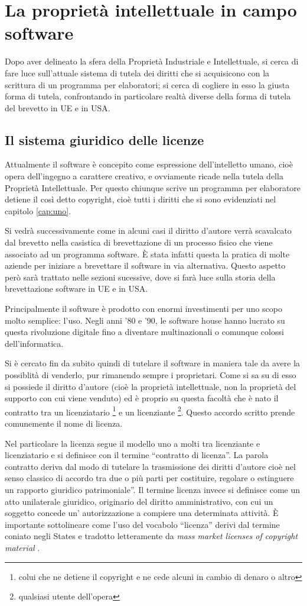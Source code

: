 \chapter{La proprietà intellettuale in campo software}
Dopo aver delineato la sfera della Proprietà Industriale e Intellettuale, si cerca di fare luce sull'attuale sistema di tutela dei diritti che si acquisicono con la scrittura di un programma per elaboratori; si cerca di cogliere in esso la giusta forma di tutela,  confrontando in particolare realtà diverse della forma di tutela del brevetto in UE e in USA.

\section{Il sistema giuridico delle licenze}
Attualmente il software è concepito come espressione dell'intelletto umano, cioè opera dell'ingegno a carattere creativo, e ovviamente ricade nella tutela della Proprietà Intellettuale. Per questo chiunque scrive un programma per elaboratore detiene il così detto copyright, cioè tutti i diritti che si sono evidenziati nel capitolo \ref{cap:uno}.

Si vedrà successivamente come in alcuni casi il diritto d'autore verrà scavalcato dal brevetto nella casistica di brevettazione di un processo fisico che viene associato ad un programma software. \`E stata infatti questa la pratica di molte aziende per iniziare a brevettare il software in via alternativa. Questo aspetto però sarà trattato nelle sezioni sucessive, dove si farà luce sulla storia della brevettazione software in UE e in USA.

Principalmente il software è prodotto con enormi investimenti per uno scopo molto semplice: l'uso. Negli anni '80 e '90, le software house hanno lucrato su questa rivoluzione digitale fino a diventare multinazionali o comunque colossi dell'informatica.

Si è cercato fin da subito quindi di tutelare il software in maniera tale da avere la possiblità di venderlo, pur rimanendo sempre i proprietari. Come si sa su di esso si possiede il diritto d'autore (cioè la proprietà intellettuale, non la proprietà del supporto con cui viene venduto) ed è proprio su questa facoltà che è nato il contratto tra un licenziatario \footnote{colui che ne detiene il copyright e ne cede alcuni in cambio di denaro o altro} e un licenziante \footnote{qualsiasi utente dell'opera}. Questo accordo scritto prende comunemente il nome di licenza.

Nel particolare la licenza segue il modello uno a molti tra licenziante e licenziatario e si definisce con il termine ``contratto di licenza''. La parola contratto deriva dal modo di tutelare la trasmissione dei diritti d'autore cioè nel senso classico di accordo  tra due o più parti per costituire, regolare o estinguere un rapporto giuridico patrimoniale”.
Il termine licenza invece si definisce come un atto unilaterale giuridico, originario del diritto amministrativo, con cui un soggetto concede un' autorizzazione a compiere una determinata attività. \`E importante sottolineare come l'uso del vocabolo ``licenza'' derivi dal termine coniato negli States e tradotto letteramente da \textit{mass market licenses of copyright material }.

